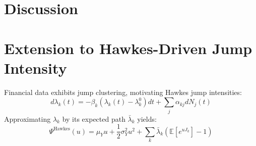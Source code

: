 \documentclass{article} %
\theoremstyle{plain}
\theoremstyle{definition} %
\begin{document}
\section{Discussion}


\section{Extension to Hawkes-Driven Jump Intensity}
Financial data exhibits jump clustering, motivating Hawkes jump intensities:
\[
d\lambda_k(t) = -\beta_k(\lambda_k(t)-\lambda_k^0)dt + \sum_j \alpha_{kj}dN_j(t)
\]
Approximating $\lambda_k$ by its expected path $\bar{\lambda}_k$ yields:
\[
\Psi^{\text{Hawkes}}(u) = \mu_Y u + \frac{1}{2}\sigma_Y^2u^2 + \sum_k \bar{\lambda}_k\left(\mathbb{E}[e^{u J_k}]-1\right)
\]

\end{document}
